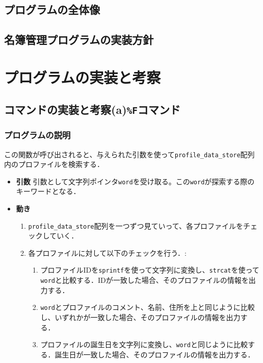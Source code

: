 \subsection{プログラムの全体像}
\subsection{名簿管理プログラムの実装方針}
\clearpage
\section{プログラムの実装と考察}
  \subsection{コマンドの実装と考察(a)\texttt{\%F}コマンド}

    \subsubsection{プログラムの説明}
    
    この関数が呼び出されると、与えられた引数を使って\texttt{profile\_data\_store}配列内のプロファイルを検索する．

      \begin{itemize}
        \item \textbf{引数} 引数として文字列ポインタ\texttt{word}を受け取る。この\texttt{word}が探索する際のキーワードとなる．
        \item \textbf{動き}
        \begin{enumerate}
          \item \texttt{profile\_data\_store}配列を一つずつ見ていって、各プロファイルをチェックしていく．
          \item 各プロファイルに対して以下のチェックを行う．:
          \begin{enumerate}
            \item プロファイルIDを\texttt{sprintf}を使って文字列に変換し、\texttt{strcat}を使って\texttt{word}と比較する．IDが一致した場合、そのプロファイルの情報を出力する．
            \item \texttt{word}とプロファイルのコメント、名前、住所を上と同じように比較し、いずれかが一致した場合、そのプロファイルの情報を出力する．
            \item プロファイルの誕生日を文字列に変換し、\texttt{word}と同じように比較する．誕生日が一致した場合、そのプロファイルの情報を出力する．
          \end{enumerate}
        \end{enumerate}
      \end{itemize}
